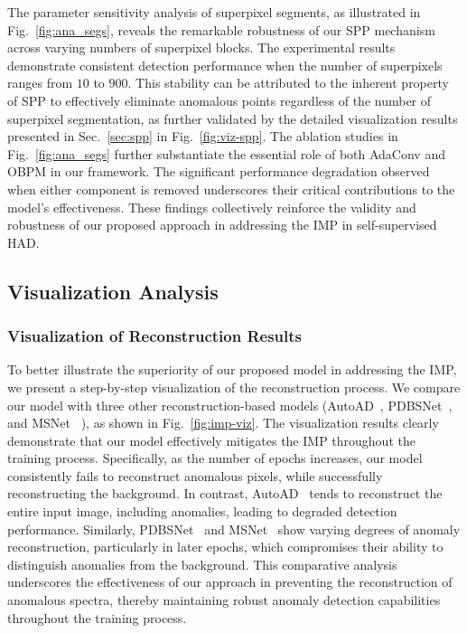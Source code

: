 The parameter sensitivity analysis of superpixel segments, as illustrated in Fig.~\ref{fig:ana_segs}, reveals the remarkable robustness of our SPP mechanism across varying numbers of superpixel blocks. The experimental results demonstrate consistent detection performance when the number of superpixels ranges from $10$ to $900$. This stability can be attributed to the inherent property of SPP to effectively eliminate anomalous points regardless of the number of superpixel segmentation, as further validated by the detailed visualization results presented in Sec.~\ref{sec:spp} in Fig.~\ref{fig:viz-spp}. The ablation studies in Fig.~\ref{fig:ana_segs} further substantiate the essential role of both AdaConv and OBPM in our framework. The significant performance degradation observed when either component is removed underscores their critical contributions to the model's effectiveness. These findings collectively reinforce the validity and robustness of our proposed approach in addressing the IMP in self-supervised HAD.












\subsection{Visualization Analysis}


\subsubsection{Visualization of Reconstruction Results}
To better illustrate the superiority of our proposed model in addressing the IMP, we present a step-by-step visualization of the reconstruction process. We compare our model with three other reconstruction-based models (AutoAD~\cite{AutoAD}, PDBSNet~\cite{PDBSNet}, and MSNet~\cite{MSNet} ), as shown in Fig.~\ref{fig:imp-viz}. The visualization results clearly demonstrate that our model effectively mitigates the IMP throughout the training process. Specifically, as the number of epochs increases, our model consistently fails to reconstruct anomalous pixels, while successfully reconstructing the background. In contrast, AutoAD~\cite{AutoAD} tends to reconstruct the entire input image, including anomalies, leading to degraded detection performance. Similarly, PDBSNet~\cite{PDBSNet} and MSNet~\cite{MSNet} show varying degrees of anomaly reconstruction, particularly in later epochs, which compromises their ability to distinguish anomalies from the background. This comparative analysis underscores the effectiveness of our approach in preventing the reconstruction of anomalous spectra, thereby maintaining robust anomaly detection capabilities throughout the training process.


